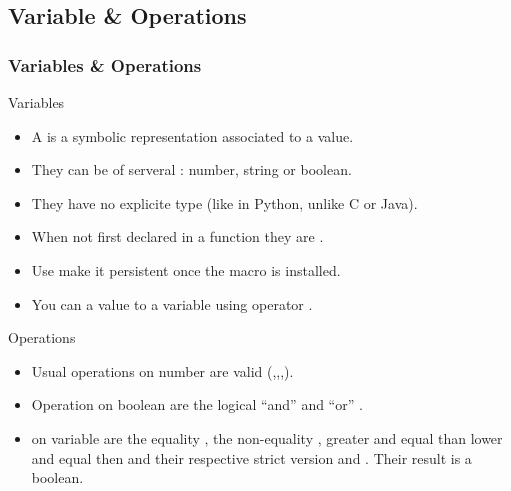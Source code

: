 \subsection{Variable \& Operations}
\begin{frame}
  \frametitle<presentation>{Variables \& Operations}
  \begin{block}{Variables}
    \begin{itemize}
    \item A  is a symbolic representation associated to a value.
    \item They can be of serveral : number, string or boolean.
    \item They have no explicite type (like in Python, unlike C or Java).
    \item When not first declared in a function they are .
    \item Use  make it persistent once the macro is installed.
    \item You can  a value to a variable using operator \code{=}.
    \end{itemize}
  \end{block}
  \begin{block}{Operations}
    \begin{itemize}
    \item Usual operations on number are valid (\code{+},\code{-},\code{*},\code{/}).
    \item Operation on boolean are the logical ``and'' \code{\&\&} and ``or''  \code{||}.
    \item {} on variable are the equality \code{==},
      the non-equality \code{!=}, greater and equal than \code{>=}
      lower and equal then \code{<=} and their respective strict
      version \code{>} and \code{<}. Their result is a boolean.
    \end{itemize}
  \end{block}
\end{frame}

\begin{frame}
  \begin{example}~\par
    
  \end{example}
\end{frame}

